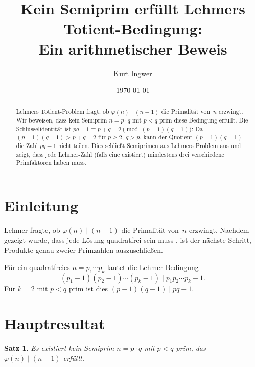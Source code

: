 \documentclass[12pt,a4paper]{amsart}
\newtheorem{theorem}{Satz}[section]
\theoremstyle{definition}
\newcommand{\euler}{\varphi}
\begin{document}

\title{Kein Semiprim erfüllt Lehmers Totient-Bedingung:\\ Ein arithmetischer Beweis}

\author{Kurt Ingwer}
\address{Specialist Mathematics Project, Version Build 44}
\date{\today}

\begin{abstract}
Lehmers Totient-Problem fragt, ob $\euler(n) \mid (n-1)$ die Primalität von~$n$ erzwingt.
Wir beweisen, dass kein Semiprim $n = p \cdot q$ mit $p < q$ prim diese Bedingung erfüllt.
Die Schlüsselidentität ist $pq - 1 \equiv p + q - 2 \pmod{(p-1)(q-1)}$: Da
$(p-1)(q-1) > p + q - 2$ für $p \ge 2$, $q > p$, kann der Quotient $(p-1)(q-1)$
die Zahl $pq - 1$ nicht teilen. Dies schließt Semiprimen aus Lehmers Problem aus
und zeigt, dass jede Lehmer-Zahl (falls eine existiert) mindestens drei verschiedene
Primfaktoren haben muss.
\end{abstract}

\maketitle

\section{Einleitung}

Lehmer \cite{Lehmer1932} fragte, ob $\euler(n) \mid (n-1)$ die Primalität von~$n$ erzwingt.
Nachdem gezeigt wurde, dass jede Lösung quadratfrei sein muss \cite{Ingwer2026qfrei},
ist der nächste Schritt, Produkte genau zweier Primzahlen auszuschließen.

Für ein quadratfreies $n = p_1 \cdots p_k$ lautet die Lehmer-Bedingung
\[
  (p_1-1)(p_2-1)\cdots(p_k-1) \mid p_1 p_2 \cdots p_k - 1.
\]
Für $k = 2$ mit $p < q$ prim ist dies $(p-1)(q-1) \mid pq - 1$.

\section{Hauptresultat}

\begin{theorem}
\label{thm:keinsemi}
Es existiert kein Semiprim $n = p \cdot q$ mit $p < q$ prim, das
$\euler(n) \mid (n-1)$ erfüllt.
\end{theorem}
\end{document}
